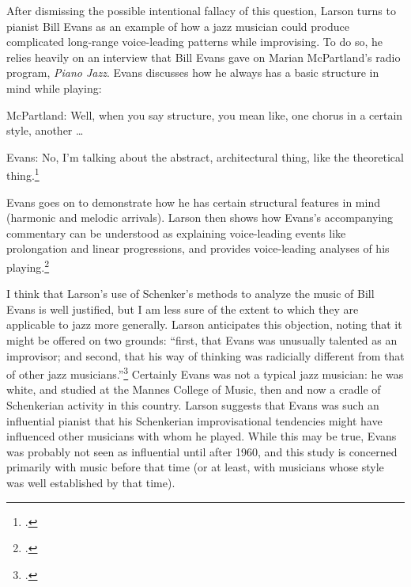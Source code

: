 \documentclass[diss]{subfiles}
\begin{document}
After dismissing the possible intentional fallacy of this question, Larson
turns to pianist Bill Evans as an example of how a jazz musician could produce
complicated long-range voice-leading patterns while improvising. To do so, he
relies heavily on an interview that Bill Evans gave on Marian McPartland’s
radio program, \emph{Piano Jazz}. Evans discusses how he always has
a basic structure in mind while playing:
\begin{quoting}
  \singlespacing
  McPartland: Well, when you say structure, you mean like, one chorus in a
  certain style, another \ldots

  \vspace{\baselineskip} \noindent
  Evans: No, I’m talking about the abstract, architectural thing, like the
  theoretical thing.\footcite[219]{larson:1998}
\end{quoting}
Evans goes on to demonstrate how he has certain structural features in mind
(harmonic and melodic arrivals). Larson then shows how Evans’s accompanying
commentary can be understood as explaining  voice-leading events like
prolongation and linear progressions, and provides voice-leading analyses of
his playing.\footcite[See especially the table in][229]{larson:1998}

I think that Larson’s use of Schenker’s methods to analyze the music of Bill
Evans is well justified, but I am less sure of the extent to which they are
applicable to jazz more generally. Larson anticipates this objection, noting
that it might be offered on two grounds: “first, that Evans was unusually
talented as an improvisor; and second, that his way of thinking was radicially
different from that of other jazz musicians.”\footcite[239]{larson:1998}
Certainly Evans was not a typical jazz musician: he was white, and studied at
the Mannes College of Music, then and now a cradle of Schenkerian activity in
this country. Larson suggests that Evans was such an influential pianist
that his Schenkerian improvisational tendencies might have influenced other
musicians with whom he played. While this may be true, Evans was probably
not seen as influential until after 1960, and this study is concerned
primarily with music before that time (or at least, with musicians whose style
was well established by that time).
\end{document}
